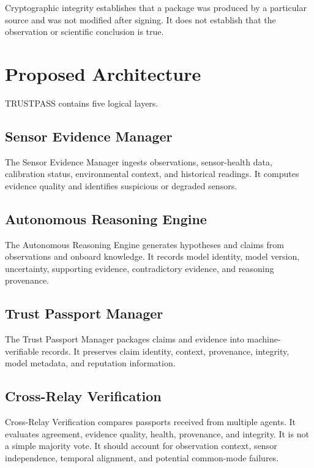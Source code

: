 \documentclass[10pt,conference]{IEEEtran}
\begin{document}
Cryptographic integrity establishes that a package was produced by a particular source and was not modified after signing. It does not establish that the observation or scientific conclusion is true.

\section{Proposed Architecture}
\label{sec:architecture}

TRUSTPASS contains five logical layers.

\subsection{Sensor Evidence Manager}

The Sensor Evidence Manager ingests observations, sensor-health data, calibration status, environmental context, and historical readings. It computes evidence quality and identifies suspicious or degraded sensors.

\subsection{Autonomous Reasoning Engine}

The Autonomous Reasoning Engine generates hypotheses and claims from observations and onboard knowledge. It records model identity, model version, uncertainty, supporting evidence, contradictory evidence, and reasoning provenance.

\subsection{Trust Passport Manager}

The Trust Passport Manager packages claims and evidence into machine-verifiable records. It preserves claim identity, context, provenance, integrity, model metadata, and reputation information.

\subsection{Cross-Relay Verification}

Cross-Relay Verification compares passports received from multiple agents. It evaluates agreement, evidence quality, health, provenance, and integrity. It is not a simple majority vote. It should account for observation context, sensor independence, temporal alignment, and potential common-mode failures.
\end{document}
